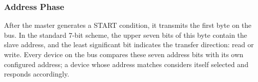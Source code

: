 \subsubsection{Address Phase}
\label{chap:Back_I2C_Protocol_Address}

After the master generates a START condition, it transmits the first byte on 
the bus. In the standard 7-bit scheme, the upper seven bits of this byte contain 
the slave address, and the least significant bit indicates the transfer direction: read 
or write. Every device on the bus compares these seven address bits with its own 
configured address; a device whose address matches considers itself selected and 
responds accordingly.
